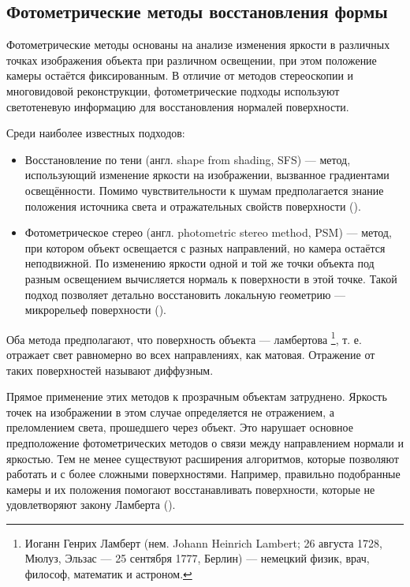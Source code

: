 \subsection{Фотометрические методы восстановления формы}

Фотометрические методы основаны на анализе изменения яркости в различных точках
изображения объекта при различном освещении, при этом положение камеры остаётся
фиксированным. В отличие от методов стереоскопии и многовидовой реконструкции,
фотометрические подходы используют светотеневую информацию для восстановления
нормалей поверхности.

Среди наиболее известных подходов:

\begin{itemize}
	\item Восстановление по тени (англ. shape from shading, SFS) —
	метод, использующий изменение яркости на изображении, вызванное градиентами
	освещённости. Помимо чувствительности к шумам предполагается знание положения источника света и
	отражательных свойств поверхности (\cite{Horn1989SFS}).
	\item Фотометрическое стерео (англ. photometric stereo method, PSM) — метод, при котором
	объект освещается с разных направлений, но камера остаётся неподвижной. По
	изменению яркости одной и той же точки объекта под разным освещением
	вычисляется нормаль к поверхности в этой точке. Такой подход позволяет детально
	восстановить локальную геометрию — микрорельеф поверхности
	(\cite{10.1117/12.7972479}).
\end{itemize}

Оба метода предполагают, что поверхность объекта — ламбертова \footnote{Иоганн
Генрих Ламберт (нем. Johann Heinrich Lambert; 26 августа 1728, Мюлуз, Эльзас —
25 сентября 1777, Берлин) — немецкий физик, врач, философ, математик и
астроном.}, т. е.  отражает свет равномерно во всех направлениях, как матовая.
Отражение от таких поверхностей называют диффузным.

Прямое применение этих методов к прозрачным объектам затруднено. Яркость точек
на изображении в этом случае определяется не отражением, а преломлением света,
прошедшего через объект. Это нарушает основное предположение фотометрических
методов о связи между направлением нормали и яркостью. Тем не менее существуют
расширения алгоритмов, которые позволяют работать и с более сложными поверхностями.
Например, правильно подобранные камеры и их положения помогают восстанавливать поверхности,
которые не удовлетворяют закону Ламберта (\cite{McGunnigle-2012}).


